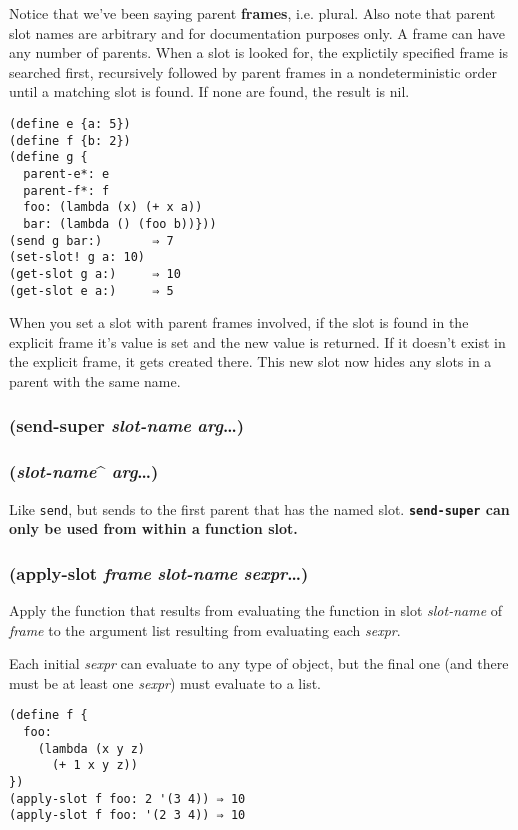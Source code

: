 \documentclass{article}
\begin{document}
Notice that we’ve been saying parent \textbf{frames}, i.e. plural. Also note that parent slot
names are arbitrary and for documentation purposes only. A frame can have any number of
parents. When a slot is looked for, the explictily specified frame is searched first,
recursively followed by parent frames in a nondeterministic order until a matching slot is
found. If none are found, the result is nil.

\begin{verbatim}
(define e {a: 5})
(define f {b: 2})
(define g {
  parent-e*: e
  parent-f*: f
  foo: (lambda (x) (+ x a))
  bar: (lambda () (foo b))}))
(send g bar:)       ⇒ 7
(set-slot! g a: 10)
(get-slot g a:)     ⇒ 10
(get-slot e a:)     ⇒ 5
\end{verbatim}

When you set a slot with parent frames involved, if the slot is found in the explicit frame
it’s value is set and the new value is returned. If it doesn’t exist in the explicit frame, it
gets created there. This new slot now hides any slots in a parent with the same name.

\subsubsection{(send-super \emph{slot-name} \emph{arg}\ldots{})}

\subsubsection{(\emph{slot-name}\^{} \emph{arg}\ldots{})}

Like \verb|send|, but sends to the first parent that has the named slot.
\textbf{\texttt{send-super} can only be used from within a function slot.}

\subsubsection{(apply-slot \emph{frame} \emph{slot-name} \emph{sexpr}\ldots{})}

Apply the function that results from evaluating the function in slot \emph{slot-name} of
\emph{frame} to the argument list resulting from evaluating each \emph{sexpr}.

Each initial \emph{sexpr} can evaluate to any type of object, but the final one (and there
must be at least one \emph{sexpr}) must evaluate to a list.

\begin{verbatim}
(define f {
  foo: 
    (lambda (x y z) 
      (+ 1 x y z))
})
(apply-slot f foo: 2 '(3 4)) ⇒ 10
(apply-slot f foo: '(2 3 4)) ⇒ 10
\end{verbatim}
\end{document}
